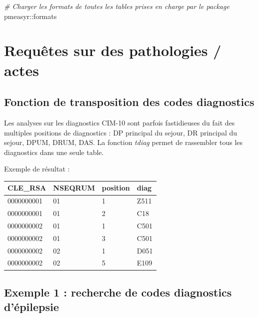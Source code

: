 \documentclass[]{book}
\newenvironment{Shaded}{\begin{snugshade}}{\end{snugshade}}
\newcommand{\KeywordTok}[1]{\textcolor[rgb]{0.13,0.29,0.53}{\textbf{{#1}}}}
\newcommand{\StringTok}[1]{\textcolor[rgb]{0.31,0.60,0.02}{{#1}}}
\newcommand{\CommentTok}[1]{\textcolor[rgb]{0.56,0.35,0.01}{\textit{{#1}}}}
\newcommand{\NormalTok}[1]{{#1}}
\begin{document}
\begin{Shaded}
\begin{Highlighting}[]
\CommentTok{# Charger les formats de toutes les tables prises en charge par le package}
\NormalTok{pmeasyr::formats}
\end{Highlighting}
\end{Shaded}

\chapter{Requêtes sur des pathologies /
actes}\label{requetes-sur-des-pathologies-actes}

\section{Fonction de transposition des codes
diagnostics}\label{fonction-de-transposition-des-codes-diagnostics}

Les analyses sur les diagnostics CIM-10 sont parfois fastidieuses du
fait des multiples positions de diagnostics : DP principal du sejour, DR
principal du sejour, DPUM, DRUM, DAS. La fonction \emph{tdiag} permet de
rassembler tous les diagnostics dans une seule table.

\begin{Shaded}
\end{Shaded}

Exemple de résultat :

\begin{longtable}[]{@{}llll@{}}
\toprule
CLE\_RSA & NSEQRUM & position & diag\tabularnewline
\midrule
\endhead
0000000001 & 01 & 1 & Z511\tabularnewline
0000000001 & 01 & 2 & C18\tabularnewline
0000000002 & 01 & 1 & C501\tabularnewline
0000000002 & 01 & 3 & C501\tabularnewline
0000000002 & 02 & 1 & D051\tabularnewline
0000000002 & 02 & 5 & E109\tabularnewline
\bottomrule
\end{longtable}

\section{Exemple 1 : recherche de codes diagnostics
d'épilepsie}\label{exemple-1-recherche-de-codes-diagnostics-depilepsie}
\end{document}
